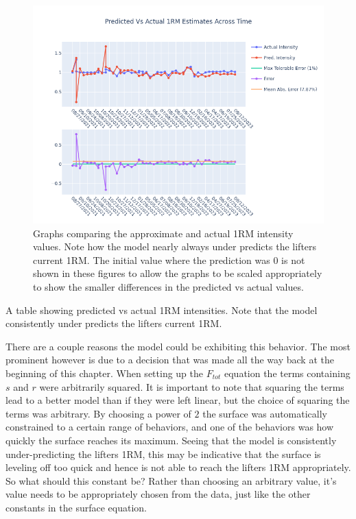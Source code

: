 \begin{figure}[htb]
    \centering
    \includegraphics[scale=0.55]{images/ch3/PredVsActual1RM.basic.png}
    \caption{Graphs comparing the approximate and actual 1RM intensity values. Note how the model nearly always under predicts the lifters current 1RM. The initial value where the prediction was $0$ is not shown in these figures to allow the graphs to be scaled appropriately to show the smaller differences in the predicted vs actual values.}
    \label{fig:ApproximateVsActual1RMIntensity}
\end{figure}
\begin{table}[p]
    \centering
	\caption{A table showing predicted vs actual 1RM intensities. Note that the model consistently under predicts the lifters current 1RM.}
	\label{tab:BasicSurface1RMEstimations}
\end{table}

There are a couple reasons the model could be exhibiting this behavior. The most prominent however is due to a decision that was made all the way back at the beginning of this chapter. When setting up the $F_{tot}$ equation the terms containing $s$ and $r$ were arbitrarily squared. It is important to note that squaring the terms lead to a better model than if they were left linear, but the choice of squaring the terms was arbitrary. By choosing a power of $2$ the surface was automatically constrained to a certain range of behaviors, and one of the behaviors was how quickly the surface reaches its maximum. Seeing that the model is consistently under-predicting the lifters 1RM, this may be indicative that the surface is leveling off too quick and hence is not able to reach the lifters 1RM appropriately. So what should this constant be? Rather than choosing an arbitrary value, it's value needs to be appropriately chosen from the data, just like the other constants in the surface equation.

